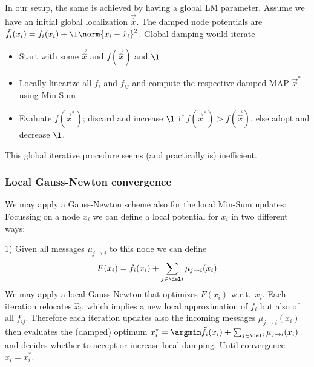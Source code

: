 In our setup, the same is achieved by having a global LM
parameter. Assume we have an initial global localization $\vec{\hat x}$. The
damped node potentials are $\tilde f_i(x_i) = f_i(x_i)
+ \l\norm{x_i-\hat x_i}^2$. Global damping would iterate
\begin{itemize}
\item Start with some $\vec{\hat x}$ and $f(\vec{\hat x})$ and $\l$
\item Locally linearize all $\tilde f_i$ and $f_{ij}$ and compute the
respective damped MAP $\vec x^*$ using Min-Sum
\item Evaluate $f(\vec x^*)$; discard and increase $\l$ if $f(\vec
x^*)>f(\vec{\hat x})$, else adopt and decrease $\l$.
\end{itemize}
This global iterative procedure seems (and practically is) inefficient.

\subsubsection{Local Gauss-Newton convergence}

We may apply a Gauss-Newton scheme also for the local Min-Sum updates:
Focussing on a node $x_i$ we can define a local potential for $x_i$ in
two different ways:

1) Given all messages $\mu_{j\to i}$ to this node we can define
\begin{align}
F(x_i) = f_i(x_i) + \sum_{j\in\del i} \mu_{j\to i}(x_i)
\end{align}
We may apply a local Gauss-Newton that optimizes $F(x_i)$ w.r.t.\
$x_i$. Each iteration relocates $\hat x_i$, which implies a new local
approximation of $f_i$ but also of all $f_{ij}$. Therefore each
iteration updates also the incoming messages $\mu_{j\to i}(x_i)$ then
evaluates the (damped) optimum $x^*_i = \argmin \tilde f_i(x_i)
+ \sum_{j\in\del i} \mu_{j\to i}(x_i)$ and decides whether to accept
or increase local damping. Until convergence $\hat x_i=x^*_i$.

